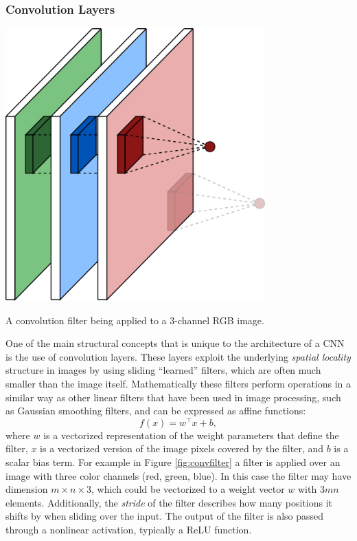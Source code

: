 \subsubsection{Convolution Layers}
\begin{marginfigure} 
\begin{center}
\includegraphics[width=0.75\textwidth]{tex/figs/ch12_figs/convolution.png}
\caption{A convolution filter being applied to a 3-channel RGB image.}
\label{fig:convfilter}
\end{center}
\end{marginfigure}
One of the main structural concepts that is unique to the architecture of a CNN is the use of convolution layers. 
These layers exploit the underlying \textit{spatial locality} structure in images by using sliding ``learned'' filters, which are often much smaller than the image itself. Mathematically these filters perform operations in a similar way as other linear filters that have been used in image processing, such as Gaussian smoothing filters, and can be expressed as affine functions:
\begin{equation*}
    f(x) = w^\top x + b,
\end{equation*}
where $w$ is a vectorized representation of the weight parameters that define the filter, $x$ is a vectorized version of the image pixels covered by the filter, and $b$ is a scalar bias term.
For example in Figure \ref{fig:convfilter} a filter is applied over an image with three color channels (red, green, blue). In this case the filter may have dimension $m \times n \times 3$, which could be vectorized to a weight vector $w$ with $3mn$ elements. Additionally, the \textit{stride} of the filter describes how many positions it shifts by when sliding over the input. The output of the filter is also passed through a nonlinear activation, typically a ReLU function.

